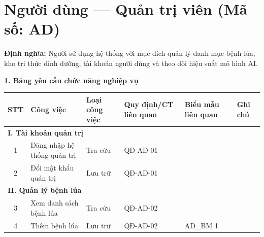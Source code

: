 \documentclass[12pt,a4paper]{article}
\begin{document}
\section{Người dùng --- Quản trị viên (Mã số: AD)}

\textbf{Định nghĩa:} Người sử dụng hệ thống với mục đích quản lý danh mục bệnh lúa, kho tri thức dinh dưỡng, tài khoản người dùng và theo dõi hiệu suất mô hình AI.

\vspace{0.3cm}
\textbf{1. Bảng yêu cầu chức năng nghiệp vụ}

\begin{longtable}{|
        c|
        >{\raggedright\arraybackslash}p{3.2cm}|
        >{\raggedright\arraybackslash}p{2.2cm}|
        >{\raggedright\arraybackslash}p{2.4cm}|
        >{\raggedright\arraybackslash}p{2.6cm}|
        >{\raggedright\arraybackslash}p{2.6cm}|}
    \hline
    \rowcolor{headerblue}
    \textbf{STT} & \textbf{Công việc}                & \textbf{Loại công việc} & \textbf{Quy định/CT liên quan} & \textbf{Biểu mẫu liên quan} & \textbf{Ghi chú} \\
    \hline
    \endhead
    \multicolumn{6}{|l|}{\cellcolor{notegreen}\textbf{I. Tài khoản quản trị}}                                                                                    \\
    \hline
    1            & Đăng nhập hệ thống quản trị       & Tra cứu                 & QĐ-AD-01                       &                             &                  \\
    \hline
    2            & Đổi mật khẩu quản trị             & Lưu trữ                 & QĐ-AD-01                       &                             &                  \\
    \hline
    \multicolumn{6}{|l|}{\cellcolor{notegreen}\textbf{II. Quản lý bệnh lúa}}                                                                                     \\
    \hline
    3            & Xem danh sách bệnh lúa            & Tra cứu                 & QĐ-AD-02                       &                             &                  \\
    \hline
    4            & Thêm bệnh lúa                     & Lưu trữ                 & QĐ-AD-02                       & AD\_BM 1                    &                  \\

\end{longtable}
\end{document}
